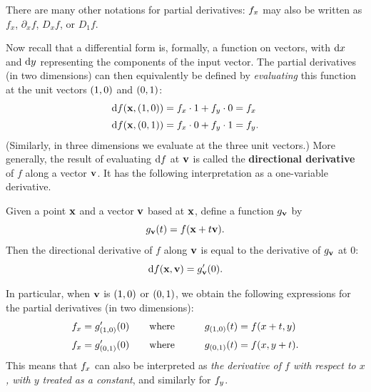 \documentclass[12pt]{amsart}
\begin{document}
There are many other notations for partial derivatives: ${f}_{x}$ may also be written as $f_x$, $\partial_x f$, $D_x f$, or $D_1 f$.

Now recall that a differential form is, formally, a function on vectors, with ${\mathrm{d} x}$ and ${\mathrm{d} y}$ representing the components of the input vector.
The partial derivatives (in two dimensions) can then equivalently be defined by \emph{evaluating} this function at the unit vectors $(1,0)$ and $(0,1)$:
\begin{align*}
  {\ensuremath{\mathrm{d} f}}(\mathbf{x},(1,0)) &= {f}_{x}\cdot 1 + {f}_{y}\cdot 0 = {f}_{x}\\[2pt]
  {\ensuremath{\mathrm{d} f}}(\mathbf{x},(0,1)) &= {f}_{x}\cdot 0 + {f}_{y}\cdot 1 = {f}_{y}.
\end{align*}
(Similarly, in three dimensions we evaluate at the three unit vectors.)
More generally, the result of evaluating ${\mathrm{d} f}$ at $\mathbf{v}$ is called the \textbf{directional derivative} of $f$ along a vector $\mathbf{v}$.
It has the following interpretation as a one-variable derivative.

\begin{thm}
  Given a point $\mathbf{x}$ and a vector $\mathbf{v}$ based at $\mathbf{x}$, define a function $g_{\mathbf{v}}$ by
  \[ g_{\mathbf{v}}(t) = f(\mathbf{x} + t \mathbf{v}). \]
  Then the directional derivative of $f$ along $\mathbf{v}$ is equal to the derivative of $g_{\mathbf{v}}$ at $0$:
  \[ {\mathrm{d} f}(\mathbf{x},\mathbf{v}) = g_{\mathbf{v}}'(0). \]
\end{thm}

In particular, when $\mathbf{v}$ is $(1,0)$ or $(0,1)$, we obtain the following expressions for the partial derivatives (in two dimensions):
\begin{alignat*}{2}
  {f}_{x} &= g_{(1,0)}'(0) \qquad\text{where}\qquad & g_{(1,0)}(t) &= f(x+t,y)\\[2pt]
  {f}_{x} &= g_{(0,1)}'(0) \qquad\text{where}\qquad & g_{(0,1)}(t) &= f(x,y+t).
\end{alignat*}
This means that ${f}_{x}$ can also be interpreted as \emph{the derivative of $f$ with respect to $x$, with $y$ treated as a constant}, and similarly for ${f}_{y}$.
\end{document}
